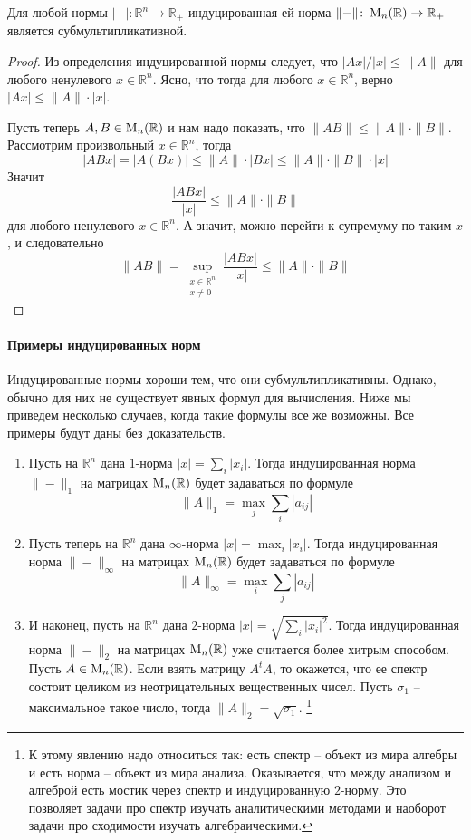 \begin{claim*}
Для любой нормы $|{-}|\colon \mathbb R^n\to \mathbb R_+$ индуцированная ей норма $\|{-}\|\colon \operatorname{M}_{n}(\mathbb R)\to \mathbb R_+$ является субмультипликативной.
\end{claim*}
\begin{proof}
Из определения индуцированной нормы следует, что $|Ax|/|x|\leqslant \|A\|$ для любого ненулевого $x\in\mathbb R^n$.
Ясно, что тогда для любого $x\in\mathbb R^n$, верно $|Ax|\leqslant \|A\|\cdot|x|$.

Пусть теперь $A, B\in\operatorname{M}_{n}(\mathbb R)$ и нам надо показать, что $\|AB\|\leqslant \|A\|\cdot \|B\|$.
Рассмотрим произвольный $x\in\mathbb R^n$, тогда
\[
|ABx| = |A (Bx)|\leqslant \|A\|\cdot |Bx|\leqslant \|A\| \cdot \|B\|\cdot |x|
\]
Значит
\[
\frac{|ABx|}{|x|}\leqslant \|A\|\cdot\|B\|
\]
для любого ненулевого $x\in\mathbb R^n$.
А значит, можно перейти к супремуму по таким $x$, и следовательно
\[
\|AB\| = \sup_{\substack{x\in\mathbb R^n\\x\neq 0}}\frac{|ABx|}{|x|}\leqslant \|A\|\cdot \|B\|
\]
\end{proof}

\paragraph{Примеры индуцированных норм}

Индуцированные нормы хороши тем, что они субмультипликативны.
Однако, обычно для них не существует явных формул для вычисления.
Ниже мы приведем несколько случаев, когда такие формулы все же возможны.
Все примеры будут даны без доказательств.
\begin{enumerate}
\item Пусть на $\mathbb R^n$ дана $1$-норма $|x| = \sum_i |x_i|$.
Тогда индуцированная норма $\|{-}\|_1$ на матрицах $\operatorname{M}_{n}(\mathbb R)$ будет задаваться по формуле 
\[
\|A\|_1 = \max_j\sum_i|a_{ij}|
\]

\item Пусть теперь на $\mathbb R^n$ дана $\infty$-норма $|x| = \max_i |x_i|$.
Тогда индуцированная норма $\|{-}\|_\infty$ на матрицах $\operatorname{M}_{n}(\mathbb R)$ будет задаваться по формуле
\[
\|A\|_\infty = \max_i\sum_j|a_{ij}|
\]

\item И наконец, пусть на $\mathbb R^n$ дана $2$-норма $|x| = \sqrt{\sum_i |x_i|^2}$.
Тогда индуцированная норма $\|{-}\|_2$ на матрицах $\operatorname{M}_{n}(\mathbb R)$ уже считается более хитрым способом.
Пусть $A\in\operatorname{M}_{n}(\mathbb R)$.
Если взять матрицу $A^tA$, то окажется, что ее спектр состоит целиком из неотрицательных вещественных чисел.
Пусть $\sigma_1$ -- максимальное такое число, тогда $\|A\|_2 = \sqrt{\sigma_1}$.%
\footnote{К этому явлению надо относиться так: есть спектр -- объект из мира алгебры и есть норма -- объект из мира анализа.
Оказывается, что между анализом и алгеброй есть мостик через спектр и индуцированную $2$-норму.
Это позволяет задачи про спектр изучать аналитическими методами и наоборот задачи про сходимости изучать алгебраическими.}
\end{enumerate} 

